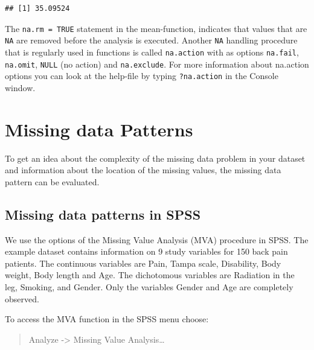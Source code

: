 \documentclass[
]{book}
\newenvironment{Shaded}{\begin{snugshade}}{\end{snugshade}}
\newcommand{\AttributeTok}[1]{\textcolor[rgb]{0.77,0.63,0.00}{#1}}
\newcommand{\ConstantTok}[1]{\textcolor[rgb]{0.00,0.00,0.00}{#1}}
\newcommand{\FunctionTok}[1]{\textcolor[rgb]{0.00,0.00,0.00}{#1}}
\newcommand{\NormalTok}[1]{#1}
\newcommand{\SpecialCharTok}[1]{\textcolor[rgb]{0.00,0.00,0.00}{#1}}
\begin{document}
\begin{Shaded}
\end{Shaded}

\begin{verbatim}
## [1] 35.09524
\end{verbatim}

The \texttt{na.rm\ =\ TRUE} statement in the mean-function, indicates that values that are \texttt{NA} are removed before the analysis is executed. Another \texttt{NA} handling procedure that is regularly used in functions is called \texttt{na.action} with as options \texttt{na.fail}, \texttt{na.omit}, \texttt{NULL} (no action) and \texttt{na.exclude}. For more information about na.action options you can look at the help-file by typing \texttt{?na.action} in the Console window.

\hypertarget{missing-data-patterns}{%
\section{Missing data Patterns}\label{missing-data-patterns}}

To get an idea about the complexity of the missing data problem in your dataset and information about the location of the missing values, the missing data pattern can be evaluated.

\hypertarget{missing-data-patterns-in-spss}{%
\subsection{Missing data patterns in SPSS}\label{missing-data-patterns-in-spss}}

We use the options of the Missing Value Analysis (MVA) procedure in SPSS. The example dataset contains information on 9 study variables for 150 back pain patients. The continuous variables are Pain, Tampa scale, Disability, Body weight, Body length and Age. The dichotomous variables are Radiation in the leg, Smoking, and Gender. Only the variables Gender and Age are completely observed.

To access the MVA function in the SPSS menu choose:

\begin{quote}
Analyze -\textgreater{} Missing Value Analysis\ldots{}
\end{quote}
\end{document}
